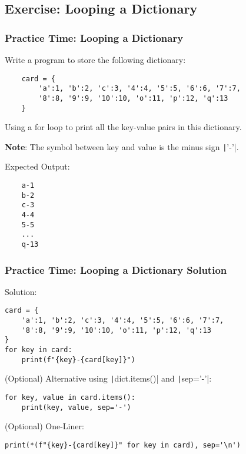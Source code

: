 \documentclass{beamer}
\begin{document}
\subsection{Exercise: Looping a Dictionary}
\begin{frame}[fragile]
    \frametitle{Practice Time: Looping a Dictionary}
    Write a program to store the following dictionary:
    \begin{verbatim}
    card = {
        'a':1, 'b':2, 'c':3, '4':4, '5':5, '6':6, '7':7,
        '8':8, '9':9, '10':10, 'o':11, 'p':12, 'q':13
    }
    \end{verbatim}
    Using a for loop to print all the key-value pairs in this dictionary.

    \textbf{Note}: The symbol between key and value is the minus sign \texttt|'-'|.

    Expected Output:
    \begin{verbatim}
    a-1
    b-2
    c-3
    4-4
    5-5
    ...
    q-13
    \end{verbatim}
\end{frame}
\begin{frame}[fragile]
    \frametitle{Practice Time: Looping a Dictionary Solution}
    Solution:
    \begin{verbatim}
card = {
    'a':1, 'b':2, 'c':3, '4':4, '5':5, '6':6, '7':7,
    '8':8, '9':9, '10':10, 'o':11, 'p':12, 'q':13
}
for key in card:
    print(f"{key}-{card[key]}")
    \end{verbatim}

    (Optional) Alternative using \texttt|dict.items()| and \texttt|sep='-'|:
    \begin{verbatim}
for key, value in card.items():
    print(key, value, sep='-')
    \end{verbatim}

    (Optional) One-Liner:
    \begin{verbatim}
print(*(f"{key}-{card[key]}" for key in card), sep='\n')
    \end{verbatim}
\end{frame}
\end{document}
